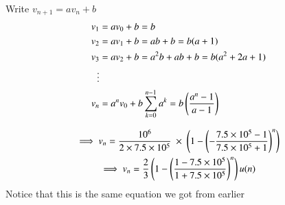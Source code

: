 \documentclass[journal,12pt,twocolumn]{IEEEtran}
\renewcommand\thesection{\arabic{section}}
\begin{document}
\begin{enumerate}[label=\arabic*.,ref=\thesection.\theenumi]
	Write \( v_{n+1} = a v_n + b \)
	\begin{align*}
		v_1 &= a v_0 + b = b \\
		v_2 &= a v_1 + b = ab + b = b(a + 1) \\
		v_3 &= a v_2 + b = a^2 b + ab + b = b(a^2 + 2a + 1) \\
		\vdots \\
		v_n &= a^n v_0 + b \sum_{k=0}^{n-1} a^k = b \left( \frac{a^n - 1}{a - 1}\right)
	\end{align*}

	\begin{gather*}
	    \implies v_n = \frac{10^6}{2 \times 7.5 \times 10^5} \ \times \
		\left(1 - \left(-\frac{7.5 \times 10^5 - 1}{7.5 \times 10^5 + 1}\right)^n\right) \\
	    \implies v_n = \frac{2}{3} \left(1 -
		\left(\frac{1 - 7.5 \times 10^5}{1 + 7.5 \times 10^5}\right)^n\right) u(n)
	\end{gather*}
	Notice that this is the same equation we got from earlier

\end{enumerate}
\end{document}
